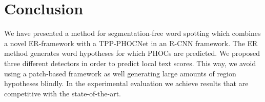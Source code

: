 \section{Conclusion}\label{sec:conclusion}
We have presented a method for segmentation-free word spotting which combines a novel
ER-framework with a TPP-PHOCNet in an R-CNN framework.
The ER method generates word hypotheses for which PHOCs are predicted.
We proposed three different detectors in order to predict local text scores.
This way, we avoid using a patch-based framework as well generating large amounts of region hypotheses blindly.
In the experimental evaluation we achieve results that are competitive with the state-of-the-art.
